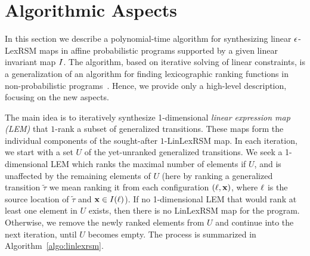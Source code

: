 \section{Algorithmic Aspects}
\label{sec:algo}

In this section we describe a polynomial-time algorithm for synthesizing linear 
$\epsilon$-LexRSM maps in affine probabilistic programs supported by a given linear 
invariant map $I$. The algorithm, based on iterative solving of linear 
constraints, is a generalization of an algorithm for finding 
lexicographic ranking functions in non-probabilistic 
programs~\cite{ADFG10:lexicographic}. Hence, we provide only a high-level 
description, focusing on the new aspects.

The main idea is to iteratively synthesize 1-dimensional {\em linear expression map (LEM)} that $1$-rank a subset of generalized transitions. These maps form the individual components of the sought-after $1$-LinLexRSM map. In each iteration, we start with a set $U$ of the yet-unranked generalized transitions. We seek a 1-dimensional LEM which ranks the maximal number of elements if $U$, and is unaffected by the remaining elements of $U$ (here by ranking a generalized transition $\tilde\tau$ we mean ranking it from each configuration $(\ell,\mathbf{x})$, where $\ell$ is the source location of $\tilde\tau$ and $\mathbf{x}\in I(\ell)$). If no 1-dimensional LEM that would rank at least one element in $U$ exists, then there is no LinLexRSM map for the program. Otherwise, we remove the newly ranked elements from $U$ and continue into the next iteration, until $U$ becomes empty. The process is summarized in Algorithm~\ref{algo:linlexrsm}.

